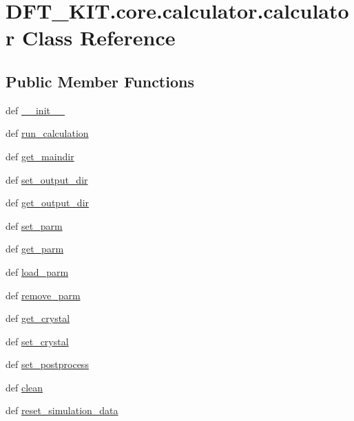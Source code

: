 \hypertarget{class_d_f_t___k_i_t_1_1core_1_1calculator_1_1calculator}{\section{D\+F\+T\+\_\+\+K\+I\+T.\+core.\+calculator.\+calculator Class Reference}
\label{class_d_f_t___k_i_t_1_1core_1_1calculator_1_1calculator}
}
\subsection*{Public Member Functions}
\begin{DoxyCompactItemize}
\item 
def \hyperlink{class_d_f_t___k_i_t_1_1core_1_1calculator_1_1calculator_a313297ecdb7f0ad50e2fa1d228cf783a}{\+\_\+\+\_\+init\+\_\+\+\_\+}
\item 
def \hyperlink{class_d_f_t___k_i_t_1_1core_1_1calculator_1_1calculator_a4302c90c91ad7492477f186623a397ae}{run\+\_\+calculation}
\item 
def \hyperlink{class_d_f_t___k_i_t_1_1core_1_1calculator_1_1calculator_afe281732adf9c5d00ee24ca42d4bcdfb}{get\+\_\+maindir}
\item 
def \hyperlink{class_d_f_t___k_i_t_1_1core_1_1calculator_1_1calculator_a6a4bba344e3d0bb74114dba596961c00}{set\+\_\+output\+\_\+dir}
\item 
def \hyperlink{class_d_f_t___k_i_t_1_1core_1_1calculator_1_1calculator_aeec37a45539b01186913578d48d10050}{get\+\_\+output\+\_\+dir}
\item 
def \hyperlink{class_d_f_t___k_i_t_1_1core_1_1calculator_1_1calculator_af6f9312c2f7f28813af872338e53ade4}{set\+\_\+parm}
\item 
def \hyperlink{class_d_f_t___k_i_t_1_1core_1_1calculator_1_1calculator_a65adbeb005dc8329e2b0e97a94d5d940}{get\+\_\+parm}
\item 
def \hyperlink{class_d_f_t___k_i_t_1_1core_1_1calculator_1_1calculator_a09cef9e96371423beaad7f0669e95604}{load\+\_\+parm}
\item 
def \hyperlink{class_d_f_t___k_i_t_1_1core_1_1calculator_1_1calculator_acc7d0eb2f9e4ce3492689c6e47f82e1b}{remove\+\_\+parm}
\item 
def \hyperlink{class_d_f_t___k_i_t_1_1core_1_1calculator_1_1calculator_a7ca6ca9b626a34bc52b5e5988f5f0399}{get\+\_\+crystal}
\item 
def \hyperlink{class_d_f_t___k_i_t_1_1core_1_1calculator_1_1calculator_ae8fab5d1aacf567c099250097ed7b489}{set\+\_\+crystal}
\item 
def \hyperlink{class_d_f_t___k_i_t_1_1core_1_1calculator_1_1calculator_aebc75e85c7b1e21c6d75aee30e6a8e18}{set\+\_\+postprocess}
\item 
def \hyperlink{class_d_f_t___k_i_t_1_1core_1_1calculator_1_1calculator_a6ff775d23aacefd9e577ea1e21a822cc}{clean}
\item 
def \hyperlink{class_d_f_t___k_i_t_1_1core_1_1calculator_1_1calculator_ae521ab992ae87366896752575005836e}{reset\+\_\+simulation\+\_\+data}
\end{DoxyCompactItemize}
